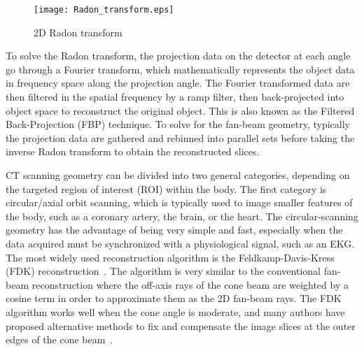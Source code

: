 \begin{figure}[h]
\centering
\texttt{[image: Radon\_transform.eps]}
\caption{2D Radon transform}
\label{fig:RadonTransform}
\end{figure}
%
To solve the Radon transform, the projection data on the detector at each angle go through a Fourier transform, which mathematically represents the object data in frequency space along the projection angle.  The Fourier transformed data are then filtered in the spatial frequency by a ramp filter, then back-projected into object space to reconstruct the original object.  This is also known as the Filtered Back-Projection (FBP) technique.  To solve for the fan-beam geometry, typically the projection data are gathered and rebinned into parallel sets before taking the inverse Radon transform to obtain the reconstructed slices.

CT scanning geometry can be divided into two general categories, depending on the targeted region of interest (ROI) within the body.  The first category is circular/axial orbit scanning, which is typically used to image smaller features of the body, such as a coronary artery, the brain, or the heart.  The circular-scanning geometry has the advantage of being very simple and fast, especially when the data acquired must be synchronized with a physiological signal, such as an EKG.  The most widely used reconstruction algorithm is the Feldkamp-Davis-Kress (FDK) reconstruction~\citep{Feldkamp1984}.  The algorithm is very similar to the conventional fan-beam reconstruction where the off-axis rays of the cone beam are weighted by a cosine term in order to approximate them as the 2D fan-beam rays.  The FDK algorithm works well when the cone angle is moderate, and many authors have proposed alternative methods to fix and compensate the image slices at the outer edges of the cone beam~\citep{Katsevich2003, Chen2003, Hu1996}.

